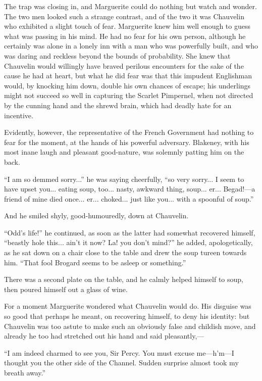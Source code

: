 \documentclass[paper=5.5in:8.5in,BCOR=7mm,twoside,DIV=calc,12pt,usegeometry,chapterprefix,endperiod,headings=big]{scrbook}
\begin{document}
The trap was closing in, and Marguerite could do nothing but watch and wonder. The two men looked such a strange contrast, and of the two it was Chauvelin who exhibited a slight touch of fear. Marguerite knew him well enough to guess what was passing in his mind. He had no fear for his own person, although he certainly was alone in a lonely inn with a man who was powerfully built, and who was daring and reckless beyond the bounds of probability. She knew that Chauvelin would willingly have braved perilous encounters for the sake of the cause he had at heart, but what he did fear was that this impudent Englishman would, by knocking him down, double his own chances of escape; his underlings might not succeed so well in capturing the Scarlet Pimpernel, when not directed by the cunning hand and the shrewd brain, which had deadly hate for an incentive.

Evidently, however, the representative of the French Government had nothing to fear for the moment, at the hands of his powerful adversary. Blakeney, with his most inane laugh and pleasant good-nature, was solemnly patting him on the back.

\enquote{I am so demmed sorry...} he was saying cheerfully, \enquote{so very sorry... I seem to have upset you... eating soup, too... nasty, awkward thing, soup... er... Begad!---a friend of mine died once... er... choked... just like you... with a spoonful of soup.}

And he smiled shyly, good-humouredly, down at Chauvelin.

\enquote{Odd's life!} he continued, as soon as the latter had somewhat recovered himself, \enquote{beastly hole this... ain't it now? La! you don't mind?} he added, apologetically, as he sat down on a chair close to the table and drew the soup tureen towards him. \enquote{That fool Brogard seems to be asleep or something.}

There was a second plate on the table, and he calmly helped himself to soup, then poured himself out a glass of wine.

For a moment Marguerite wondered what Chauvelin would do. His disguise was so good that perhaps he meant, on recovering himself, to deny his identity: but Chauvelin was too astute to make such an obviously false and childish move, and already he too had stretched out his hand and said pleasantly,---

\enquote{I am indeed charmed to see you, Sir Percy. You must excuse me---h'm---I thought you the other side of the Channel. Sudden surprise almost took my breath away.}
\end{document}
